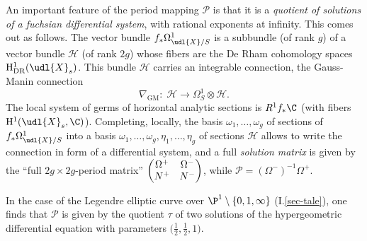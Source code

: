 \begin{para}\label{para:1.2.2}
 An important feature of the period mapping $\mathcal{P}$ is that it is
 a {\it quotient of solutions of a fuchsian differential system}, with
 rational exponents at infinity. This comes out as follows. The vector
 bundle $f_\ast\Omega^1_{\udl{X} /S}$ is a subbundle (of rank $g$) of a
 vector bundle $\mathcal{H}$ (of rank $2g$) whose fibers are the De Rham
 cohomology spaces $\mathrm{H}^1_{\mathrm{DR}}(\udl{X}_s)$. This bundle
 $\mathcal{H}$ carries an integrable connection, the Gauss-Manin
 connection
 \begin{equation*}
  \nabla_{\mathrm{GM}}:\;\mathcal{H}\rightarrow \Omega^1_S\otimes \mathcal{H}.
 \end{equation*}
 The local system of germs of horizontal analytic sections is
 $R^1f_\ast{\C}$ (with fibers
 $\mathrm{H}^1(\udl{X}_s,{\C})$). Completing, locally, the basis
 $\omega_1,\ldots,\omega_g$ of sections of $f_\ast\Omega^1_{\udl{X}/S}$
 into a basis $\omega_1,\ldots,\omega_g,\eta_1,\ldots,\eta_{g}$ of
 sections $\mathcal{H}$ allows to write the connection in form of a
 differential system, and a full {\it solution matrix} is given by the
 ``full $2g\times 2g$-period matrix''
 $\begin{pmatrix} \Omega^+ &
  \Omega^- \cr N^+ & N^-  \end{pmatrix}$, while
 $\mathcal{P}=(\Omega^-)^{-1}\Omega^+$.


 In the case of the Legendre elliptic curve over ${\P}^1\setminus
 \{0,1,\infty\}$ (\cf I.\ref{sec-tale}), one finds that $\mathcal{P}$
 is given by the 
 quotient $\tau$ of two solutions of the hypergeometric differential
 equation with parameters $\bigl(\frac{1}{2},\frac{1}{2},1\bigr)$.
\end{para}


